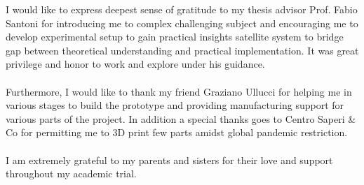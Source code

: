\documentclass[english,oneside,LaM,binding=0.0cm]{sapthesis}
\begin{document}
\begin{acknowledgments}
{}
I would like to express deepest sense of gratitude to my thesis advisor Prof. Fabio Santoni for introducing me to complex challenging subject and encouraging me to develop experimental setup to gain practical insights satellite system to bridge gap between theoretical understanding and practical implementation. It was great privilege and honor to work and explore under his guidance. \\
\\
Furthermore, I would like to thank my friend Graziano Ullucci for helping me in various stages to build the prototype and providing manufacturing support for various parts of the project. In addition a special thanks goes to Centro Saperi & Co for permitting me to 3D print few parts amidst global pandemic restriction. \\
\\
I am extremely grateful to my parents and sisters for their love and support throughout my academic trial.

\end{acknowledgments}
\begin{comment}

\newglossaryentry{policy}{
    name = policy,
    description = neural network which produces appropriate actions.
}
\end{comment}



\renewcommand{\contentsname}{Table of Contents}
\tableofcontents

\listoftables

\listoffigures


\printacronyms[type=\acronymtype, title=List of Acronyms]




\nomlabelwidth=25mm 

\renewcommand\nomgroup[1]{%
  \item[\bfseries
  \ifstrequal{#1}{A}{Spacecraft Attitude Dynamics}{%
  \ifstrequal{#1}{B}{AI based Learning Agent}{%
  \ifstrequal{#1}{C}{Other Symbols}{}}}%
]}
\end{document}
